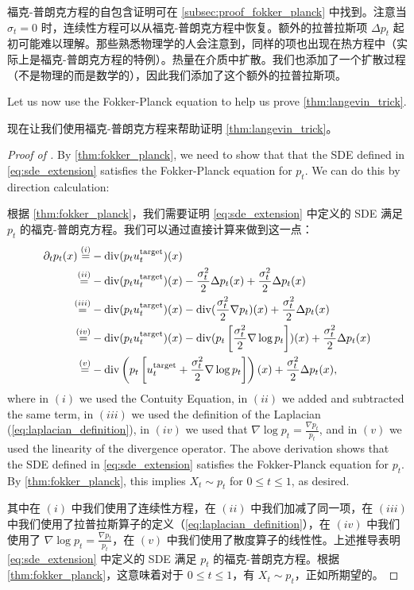 福克-普朗克方程的自包含证明可在 \cref{subsec:proof_fokker_planck} 中找到。注意当 $\sigma_t=0$ 时，连续性方程可以从福克-普朗克方程中恢复。额外的拉普拉斯项 $\Delta p_t$ 起初可能难以理解。那些熟悉物理学的人会注意到，同样的项也出现在热方程中（实际上是福克-普朗克方程的特例）。热量在介质中扩散。我们也添加了一个扩散过程（不是物理的而是数学的），因此我们添加了这个额外的拉普拉斯项。

Let us now use the Fokker-Planck equation to help us prove \cref{thm:langevin_trick}.

现在让我们使用福克-普朗克方程来帮助证明 \cref{thm:langevin_trick}。

\begin{proof}[Proof of ]
 By \cref{thm:fokker_planck}, we need to show that that the SDE defined in \cref{eq:sde_extension} satisfies the Fokker-Planck equation for $p_t$. We can do this by direction calculation:

根据 \cref{thm:fokker_planck}，我们需要证明 \cref{eq:sde_extension} 中定义的 SDE 满足 $p_t$ 的福克-普朗克方程。我们可以通过直接计算来做到这一点：
\begin{align*}
    \partial_t p_t(x) \overset{(i)}{=}& - \mathrm{div}(p_tu^{\text{target}}_t)(x)\\
    \overset{(ii)}{=}& - \mathrm{div}(p_tu^{\text{target}}_t)(x) -\frac{\sigma_t^2}{2}\Delta p_t(x)+\frac{\sigma_t^2}{2}\Delta p_t(x)\\
    \overset{(iii)}{=}& - \mathrm{div}(p_tu^{\text{target}}_t)(x) -\mathrm{div}(\frac{\sigma_t^2}{2}\nabla p_t)(x)+\frac{\sigma_t^2}{2}\Delta p_t(x)\\
    \overset{(iv)}{=}& - \mathrm{div}(p_tu^{\text{target}}_t)(x) -\mathrm{div}(p_t\left[\frac{\sigma_t^2}{2}\nabla \log p_t\right])(x)+\frac{\sigma_t^2}{2}\Delta p_t(x)\\
    \overset{(v)}{=}&- \mathrm{div}\left(p_t\left[u^{\text{target}}_t+\frac{\sigma_t^2}{2}\nabla \log p_t\right]\right)(x)+\frac{\sigma_t^2}{2}\Delta p_t(x),
\end{align*}
where in $(i)$ we used the Contuity Equation, in $(ii)$ we added and subtracted the same term, in $(iii)$ we used the definition of the Laplacian (\cref{eq:laplacian_definition}), in $(iv)$ we used that $\nabla\log p_t=\frac{\nabla p_t}{p_t}$, and in $(v)$ we used the linearity of the divergence operator. The above derivation shows that the SDE defined in \cref{eq:sde_extension} satisfies the Fokker-Planck equation for $p_t$. By \cref{thm:fokker_planck}, this implies $X_t\sim p_t$ for $0\leq t\leq 1$, as desired.

其中在 $(i)$ 中我们使用了连续性方程，在 $(ii)$ 中我们加减了同一项，在 $(iii)$ 中我们使用了拉普拉斯算子的定义（\cref{eq:laplacian_definition}），在 $(iv)$ 中我们使用了 $\nabla\log p_t=\frac{\nabla p_t}{p_t}$，在 $(v)$ 中我们使用了散度算子的线性性。上述推导表明 \cref{eq:sde_extension} 中定义的 SDE 满足 $p_t$ 的福克-普朗克方程。根据 \cref{thm:fokker_planck}，这意味着对于 $0\leq t\leq 1$，有 $X_t\sim p_t$，正如所期望的。
\end{proof}

